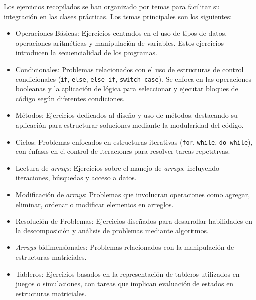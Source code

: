 \documentclass{article}
\begin{document}
Los ejercicios recopilados se han organizado por temas para facilitar su integración en las clases prácticas. Los temas principales son los siguientes: 

\begin{itemize}  
    \item Operaciones Básicas:  
    Ejercicios centrados en el uso de tipos de datos, operaciones aritméticas y manipulación de variables. Estos ejercicios introducen la secuencialidad de los programas.  

    \item Condicionales:  
    Problemas relacionados con el uso de estructuras de control condicionales (\texttt{if}, \texttt{else}, \texttt{else if}, \texttt{switch case}). Se enfoca en las operaciones booleanas y la aplicación de lógica para seleccionar y ejecutar bloques de código según diferentes condiciones.

    \item Métodos:
    Ejercicios dedicados al diseño y uso de métodos, destacando su aplicación para estructurar soluciones mediante la modularidad del código.  

    \item Ciclos:  
    Problemas enfocados en estructuras iterativas (\texttt{for}, \texttt{while}, \texttt{do-while}), con énfasis en el control de iteraciones para resolver tareas repetitivas.

    \item Lectura de \textit{arrays}:  
    Ejercicios sobre el manejo de \textit{arrays}, incluyendo iteraciones, búsquedas y acceso a datos.  

    \item Modificación de \textit{arrays}:  
    Problemas que involucran operaciones como agregar, eliminar, ordenar o modificar elementos en arreglos.  

    \item Resolución de Problemas:  
    Ejercicios diseñados para desarrollar habilidades en la descomposición y análisis de problemas mediante algoritmos.

    \item \textit{Arrays} bidimensionales:  
    Problemas relacionados con la manipulación de estructuras matriciales.  

    \item Tableros:  
    Ejercicios basados en la representación de tableros utilizados en juegos o simulaciones, con tareas que implican evaluación de estados en estructuras matriciales.
\end{itemize}  
\end{document}
